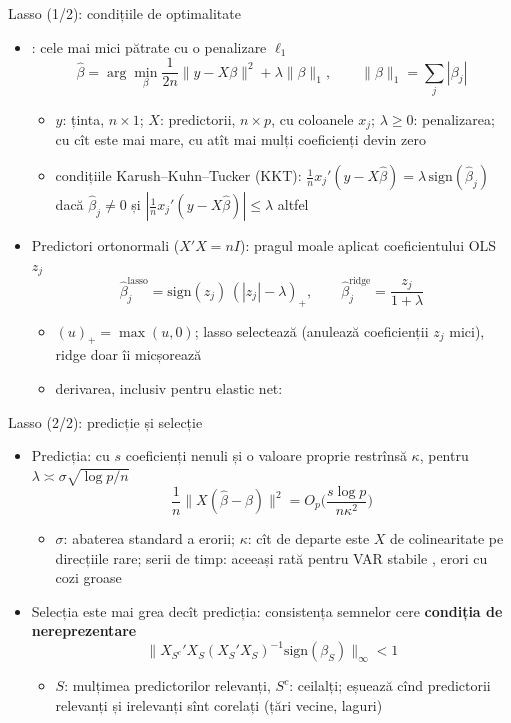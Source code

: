 \begin{frame}{Lasso (1/2): condițiile de optimalitate}
\itemsize{\small}
\begin{itemize}
    \item {}: cele mai mici pătrate cu o penalizare $\ell_1$
    \[ \hat\beta = \arg\min_\beta \frac1{2n}\|y - X\beta\|^2 + \lambda\|\beta\|_1, \qquad \|\beta\|_1 = \sum_j|\beta_j| \]
    \begin{itemize}
        \item $y$: ținta, $n \times 1$; $X$: predictorii, $n \times p$, cu coloanele $x_j$; $\lambda \ge 0$: penalizarea; cu cît este mai mare, cu atît mai mulți coeficienți devin zero
        \item condițiile Karush--Kuhn--Tucker (KKT): $\frac1n x_j'(y - X\hat\beta) = \lambda\,\mathrm{sign}(\hat\beta_j)$ dacă $\hat\beta_j \ne 0$ și $|\frac1n x_j'(y - X\hat\beta)| \le \lambda$ altfel
    \end{itemize}
    \item Predictori ortonormali ($X'X = nI$): pragul moale aplicat coeficientului OLS $z_j$
    \[ \hat\beta_j^{\mathrm{lasso}} = \mathrm{sign}(z_j)\,(|z_j| - \lambda)_+, \qquad \hat\beta_j^{\mathrm{ridge}} = \frac{z_j}{1 + \lambda} \]
    \begin{itemize}
        \item $(u)_+ = \max(u, 0)$; lasso selectează (anulează coeficienții $z_j$ mici), ridge doar îi micșorează
        \item derivarea, inclusiv pentru elastic net:   %
    \end{itemize}
\end{itemize}
\end{frame}

\begin{frame}{Lasso (2/2): predicție și selecție}
\itemsize{\small}
\begin{itemize}
    \item Predicția: cu $s$ coeficienți nenuli și o valoare proprie restrînsă $\kappa$, pentru $\lambda \asymp \sigma\sqrt{\log p/n}$
    \[ \frac1n\|X(\hat\beta - \beta)\|^2 = O_p\Big(\frac{s\log p}{n\kappa^2}\Big) \]
    \begin{itemize}
        \item $\sigma$: abaterea standard a erorii; $\kappa$: cît de departe este $X$ de colinearitate pe direcțiile rare; serii de timp: aceeași rată pentru VAR stabile , erori cu cozi groase 
    \end{itemize}
    \item Selecția este mai grea decît predicția: consistența semnelor cere \textbf{condiția de nereprezentare} 
    \[ \big\|X_{S^c}'X_S(X_S'X_S)^{-1}\mathrm{sign}(\beta_S)\big\|_\infty < 1 \]
    \begin{itemize}
        \item $S$: mulțimea predictorilor relevanți, $S^c$: ceilalți; eșuează cînd predictorii relevanți și irelevanți sînt corelați (țări vecine, laguri)
    \end{itemize}
\end{itemize}
\end{frame}

